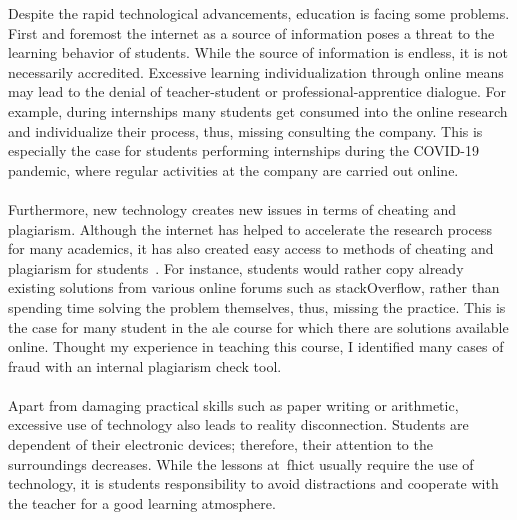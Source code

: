 Despite the rapid technological advancements, education is facing some problems.
First and foremost the internet as a source of information poses a threat to the learning behavior of students.
While the source of information is endless, it is not necessarily accredited.
Excessive learning individualization through online means may lead to the denial of teacher-student or professional-apprentice dialogue. 
For example, during internships many students get consumed into the online research and individualize their process, thus, missing consulting the company. This is especially the case for students performing internships during the COVID-19 pandemic, where regular activities at the company are carried out online.\\\\
Furthermore, new technology creates new issues in terms of cheating and plagiarism.
Although the internet has helped to accelerate the research process for many academics, it has also created easy access to methods of cheating and plagiarism for students~\cite{downside2006}.
For instance, students would rather copy already existing solutions from various online forums such as \gls{stackOverflow}, rather than spending time solving the problem themselves, thus, missing the practice. This is the case for many student in the \acrshort{ale} course for which there are solutions available online. Thought my experience in teaching this course, I identified many cases of fraud with an internal plagiarism check tool.\\\\
Apart from damaging practical skills such as paper writing or arithmetic, excessive use of technology also leads to reality disconnection. Students are dependent of their electronic devices; therefore, their attention to the surroundings decreases. While the lessons at~\acrshort{fhict} usually require the use of technology, it is students responsibility to avoid distractions and cooperate with the teacher for a good learning atmosphere. 

